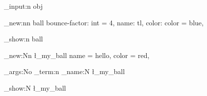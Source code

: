 \nonstopmode  \relax \ExplSyntaxOn %


\file_input:n { obj }

\obj_new:nn { ball }
  {
    bounce-factor: int = 4,
    name: tl,
    color: color = blue,
  }

\obj_show:n { ball }


\ball_new:Nn \l_my_ball
  {
    name = hello,
    color = red,
  }

\exp_args:No \msg_term:n { \ball_name:N \l_my_ball }

\ball_show:N \l_my_ball


\bye
